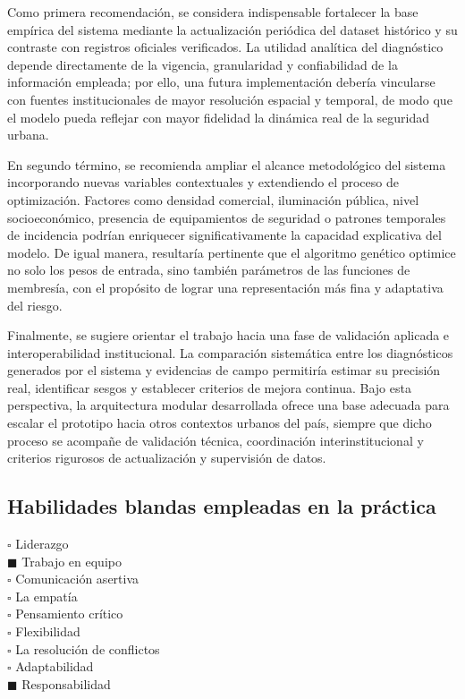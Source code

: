 \documentclass[11pt]{article}
\begin{document}
Como primera recomendación, se considera indispensable fortalecer la base empírica del sistema mediante la actualización periódica del dataset histórico y su contraste con registros oficiales verificados. La utilidad analítica del diagnóstico depende directamente de la vigencia, granularidad y confiabilidad de la información empleada; por ello, una futura implementación debería vincularse con fuentes institucionales de mayor resolución espacial y temporal, de modo que el modelo pueda reflejar con mayor fidelidad la dinámica real de la seguridad urbana.

En segundo término, se recomienda ampliar el alcance metodológico del sistema incorporando nuevas variables contextuales y extendiendo el proceso de optimización. Factores como densidad comercial, iluminación pública, nivel socioeconómico, presencia de equipamientos de seguridad o patrones temporales de incidencia podrían enriquecer significativamente la capacidad explicativa del modelo. De igual manera, resultaría pertinente que el algoritmo genético optimice no solo los pesos de entrada, sino también parámetros de las funciones de membresía, con el propósito de lograr una representación más fina y adaptativa del riesgo.

Finalmente, se sugiere orientar el trabajo hacia una fase de validación aplicada e interoperabilidad institucional. La comparación sistemática entre los diagnósticos generados por el sistema y evidencias de campo permitiría estimar su precisión real, identificar sesgos y establecer criterios de mejora continua. Bajo esta perspectiva, la arquitectura modular desarrollada ofrece una base adecuada para escalar el prototipo hacia otros contextos urbanos del país, siempre que dicho proceso se acompañe de validación técnica, coordinación interinstitucional y criterios rigurosos de actualización y supervisión de datos.

\subsection{Habilidades blandas empleadas en la práctica}
$\square$ Liderazgo \\
$\blacksquare$ Trabajo en equipo \\
$\square$ Comunicación asertiva \\
$\square$ La empatía \\
$\square$ Pensamiento crítico \\
$\square$ Flexibilidad \\
$\square$ La resolución de conflictos \\
$\square$ Adaptabilidad \\
$\blacksquare$ Responsabilidad \\
\end{document}
